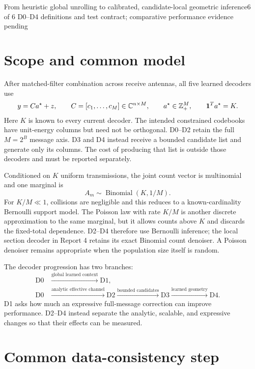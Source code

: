 \documentclass[11pt]{article}
\begin{document}
{From heuristic global unrolling to calibrated, candidate-local geometric inference}{6 of 6}
{D0--D4 definitions and test contract; comparative performance evidence pending}

\section{Scope and common model}

After matched-filter combination across receive antennas, all five learned decoders use
\[
 y=Ca^\star+z,
 \qquad C=[c_1,\ldots,c_M]\in\mathbb{C}^{n\times M},
 \qquad a^\star\in\mathbb{Z}_+^M,
 \qquad \mathbf{1}^Ta^\star=K.
\]
Here $K$ is known to every current decoder. The intended constrained codebooks have unit-energy columns but need not be
orthogonal. D0--D2 retain the full $M=2^B$ message axis. D3 and D4 instead receive a bounded candidate list and generate
only its columns. The cost of producing that list is outside those decoders and must be reported separately.

Conditioned on $K$ uniform transmissions, the joint count vector is multinomial and one marginal is
\[
 A_m\sim\operatorname{Binomial}(K,1/M).
\]
For $K/M\ll1$, collisions are negligible and this reduces to a known-cardinality Bernoulli support model. The Poisson
law with rate $K/M$ is another discrete approximation to the same marginal, but it allows counts above $K$ and discards
the fixed-total dependence. D2--D4 therefore use Bernoulli inference; the local section decoder in Report 4 retains its
exact Binomial count denoiser. A Poisson denoiser remains appropriate when the population size itself is random.

The decoder progression has two branches:
\begin{align*}
 \mathrm{D0}&\xrightarrow{\text{global learned context}}\mathrm{D1},\\
 \mathrm{D0}&\xrightarrow{\text{analytic effective channel}}\mathrm{D2}
 \xrightarrow{\text{bounded candidates}}\mathrm{D3}
 \xrightarrow{\text{learned geometry}}\mathrm{D4}.
\end{align*}
D1 asks how much an expressive full-message correction can improve performance. D2--D4 instead separate the analytic,
scalable, and expressive changes so that their effects can be measured.

\section{Common data-consistency step}
\end{document}
